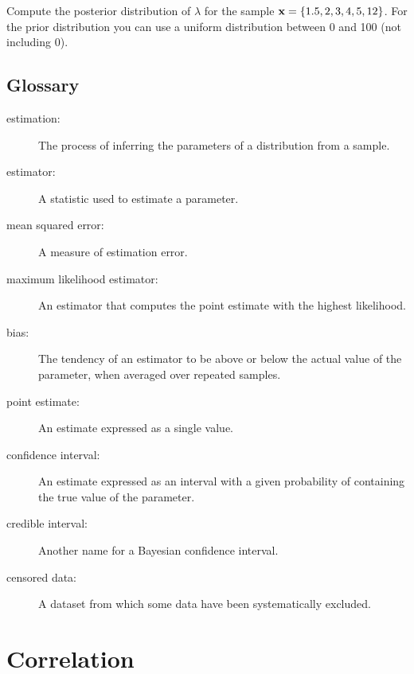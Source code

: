 \documentclass[12pt]{book}
\begin{document}
\begin{ex}

Compute the posterior distribution of $\lambda$ for the sample
$\mathbf{x} = \{ 1.5, 2, 3, 4, 5, 12 \}$.  For the prior distribution you
can use a uniform distribution between 0 and 100 (not including 0).

\end{ex}

\section{Glossary}

\begin{description}

\item[estimation:] The process of inferring the parameters of a distribution
from a sample.

\item[estimator:] A statistic used to estimate a parameter.

\item[mean squared error:] A measure of estimation error.

\item[maximum likelihood estimator:] An estimator that computes the
point estimate with the highest likelihood.

\item[bias:] The tendency of an estimator to be above or below the actual
value of the parameter, when averaged over repeated samples.

\item[point estimate:] An estimate expressed as a single value.

\item[confidence interval:] An estimate expressed as an interval with a
given probability of containing the true value of the parameter.

\item[credible interval:] Another name for a Bayesian confidence interval.

\item[censored data:] A dataset from which some data have been systematically
excluded.

\end{description}


\chapter{Correlation}
\end{document}
